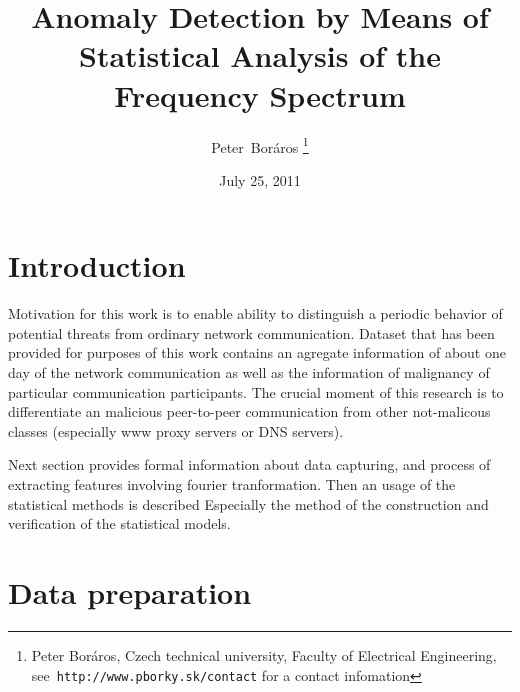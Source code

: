 \documentclass[a4paper,journal]{IEEEtran}
\begin{document}
\title{Anomaly Detection by Means of Statistical Analysis of the Frequency Spectrum}
\date{July 25, 2011}
\author{Peter~Boráros %
\thanks{{Peter Boráros}, Czech technical university, Faculty of Electrical Engineering,
see~\texttt{http://www.pborky.sk/contact} for a contact infomation}}%



\maketitle
\IEEEdisplaynotcompsoctitleabstractindextext
\IEEEpeerreviewmaketitle

\section{Introduction}
Motivation for this work is to enable ability to distinguish a periodic behavior of potential threats from ordinary
network communication. Dataset that has been provided for purposes of this work contains an agregate information of 
about one day of the network communication as well as the information of malignancy of particular communication 
participants. The crucial moment of this research is to differentiate an malicious peer-to-peer communication from
other not-malicous classes (especially www proxy servers or DNS servers).

Next section provides formal information about data capturing, and process of extracting features involving fourier
tranformation. 
Then an usage of the statistical methods is described Especially the method of the construction and verification 
of the statistical models.

\section{Data preparation}
\end{document}
